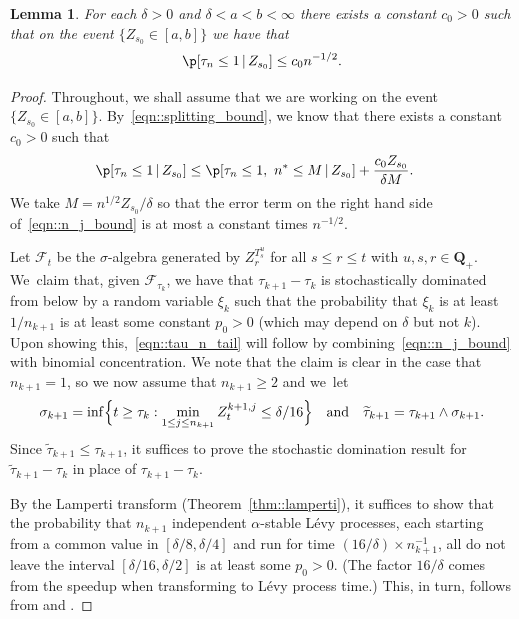 \documentclass[10pt]{amsart}
\let\mathcal\mathscr
\theoremstyle{plain}
\numberwithin{theorem}{section}
\newtheorem{lemma}[theorem]{Lemma}
\theoremstyle{definition}
\newcommand{\CF}{{\mathcal F}}
\newcommand{\Q}{{\mathbf Q}}
\let\wt\widetilde
\newcommand{\giv}{\,|\,}
\begin{document}
\begin{lemma}
\label{lem::number_of_splittings_bound}
For each $\delta > 0$ and $\delta < a < b < \infty$ there exists a constant $c_0 > 0$ such that on the event $\{ Z_{s_0} \in [a,b]\}$ we have that
\begin{equation}
\label{eqn::tau_n_tail}
\p[ \tau_n \leq 1 \giv Z_{s_0}] \leq c_0 n^{-1/2}.
\end{equation}
\end{lemma}
\begin{proof}
Throughout, we shall assume that we are working on the event $\{ Z_{s_0} \in [a,b]\}$. By~\eqref{eqn::splitting_bound}, we know that there exists a constant $c_0 > 0$ such that
\begin{align}
\p[ \tau_n \leq 1 \giv Z_{s_0}]
&\leq \p[ \tau_n \leq 1,\ n^* \leq M \giv Z_{s_0}] + \frac{c_0 Z_{s_0}}{\delta M}. \label{eqn::n_j_bound}
\end{align}
We take $M = n^{1/2} Z_{s_0}/\delta$ so that the error term on the right hand side of~\eqref{eqn::n_j_bound} is at most a constant times $n^{-1/2}$.

Let $\CF_t$ be the $\sigma$-algebra generated by $Z_r^{T_s^u}$ for all $s \leq r \leq t$ with $u,s,r \in \Q_+$. We~claim that, given $\CF_{\tau_k}$, we have that $\tau_{k+1} - \tau_k$ is stochastically dominated from below by a random variable $\xi_k$ such that the probability that $\xi_k$ is at least $1/n_{k+1}$ is at least some constant $p_0 > 0$ (which may depend on $\delta$ but not $k$). Upon showing this,~\eqref{eqn::tau_n_tail} will follow by combining~\eqref{eqn::n_j_bound} with binomial concentration. We note that the claim is clear in the case that $n_{k+1}=1$, so we now assume that $n_{k+1} \geq 2$ and we~let
\[
\sigma_{k+1} = \inf\Bigl\{ t \geq \tau_k : \min_{1 \leq j \leq n_{k+1}} Z_t^{k+1,j} \leq \delta/16 \Bigr\} \quad\text{and}\quad \wt{\tau}_{k+1} = \tau_{k+1} \wedge \sigma_{k+1}.
\]
Since $\wt{\tau}_{k+1} \leq \tau_{k+1}$, it suffices to prove the stochastic domination result for $\wt{\tau}_{k+1}-\tau_k$ in place of $\tau_{k+1}-\tau_k$.

By the Lamperti transform (Theorem~\ref{thm::lamperti}), it suffices to show that the probability that $n_{k+1}$ independent $\alpha$-stable Lévy processes, each starting from a common value in $[\delta/8,\delta/4]$ and run for time $(16/\delta) \times n_{k+1}^{-1}$, all do not leave the interval $[\delta/16,\delta/2]$ is at least some $p_0 > 0$. (The factor $16/\delta$ comes from the speedup when transforming to Lévy process time.) This, in turn, follows from \cite[Chap.\,VII, Cor.\,2]{bertoinlevybook} and \cite[Chap.\,VIII, Prop.\,4]{bertoinlevybook}.
\end{proof}
\end{document}
